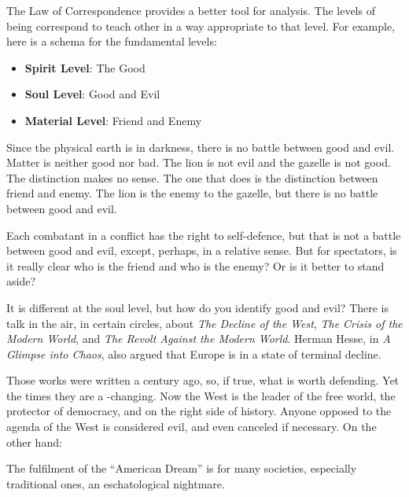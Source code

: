 The Law of Correspondence provides a better tool for analysis. The levels of being correspond to teach other in a way appropriate to that level. For example, here is a schema for the fundamental levels:

\begin{itemize}


\item \textbf{Spirit Level}: The Good


\item \textbf{Soul Level}: Good and Evil


\item \textbf{Material Level}: Friend and Enemy

\end{itemize}


Since the physical earth is in darkness, there is no battle between good and evil. Matter is neither good nor bad. The lion is not evil and the gazelle is not good. The distinction makes no sense. The one that does is the distinction between friend and enemy. The lion is the enemy to the gazelle, but there is no battle between good and evil.

Each combatant in a conflict has the right to self-defence, but that is not a battle between good and evil, except, perhaps, in a relative sense. But for spectators, is it really clear who is the friend and who is the enemy? Or is it better to stand aside?

It is different at the soul level, but how do you identify good and evil? There is talk in the air, in certain circles, about \emph{The Decline of the West}, \emph{The Crisis of the Modern World}, and
\emph{The Revolt Against the Modern World}. Herman Hesse, in \emph{A Glimpse into Chaos}, also argued that Europe is in a state of terminal decline.

Those works were written a century ago, so, if true, what is worth defending. Yet the times they are a -changing. Now the West is the leader of the free world, the protector of democracy, and on the right side of history. Anyone opposed to the agenda of the West is considered evil, and even canceled if necessary. On the other hand:

\begin{quotex}
The fulfilment of the ``American Dream'' is for many societies, especially traditional ones, an eschatological nightmare.
\end{quotex}


